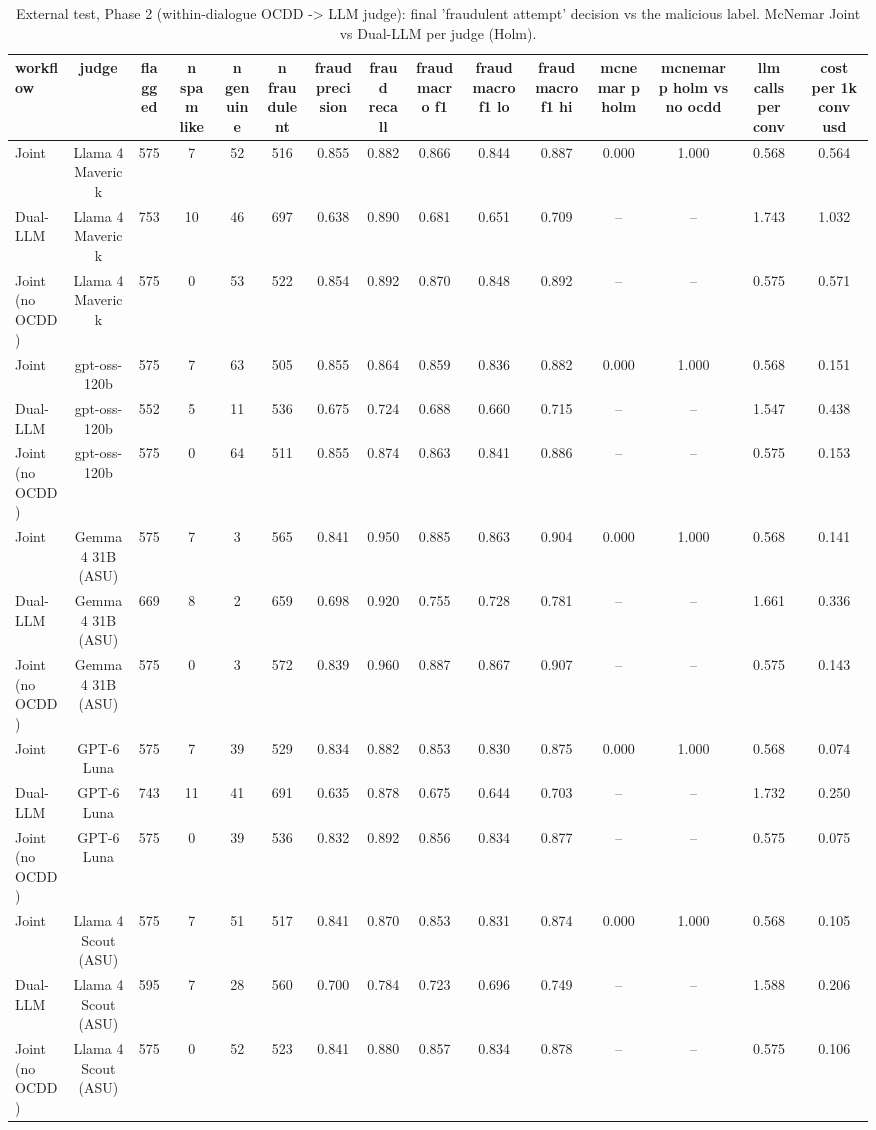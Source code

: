 \begin{table}[htbp]
\centering
\caption{External test, Phase 2 (within-dialogue OCDD -> LLM judge): final 'fraudulent attempt' decision vs the malicious label. McNemar Joint vs Dual-LLM per judge (Holm).}
\label{tab:table9_external_phase2}
\small
\begin{tabular}{lcccccccccccccc}
\toprule
\textbf{workflow} & \textbf{judge} & \textbf{flagged} & \textbf{n spam like} & \textbf{n genuine} & \textbf{n fraudulent} & \textbf{fraud precision} & \textbf{fraud recall} & \textbf{fraud macro f1} & \textbf{fraud macro f1 lo} & \textbf{fraud macro f1 hi} & \textbf{mcnemar p holm} & \textbf{mcnemar p holm vs no ocdd} & \textbf{llm calls per conv} & \textbf{cost per 1k conv usd} \\
\midrule
Joint & Llama 4 Maverick & 575 & 7 & 52 & 516 & 0.855 & 0.882 & 0.866 & 0.844 & 0.887 & 0.000 & 1.000 & 0.568 & 0.564 \\
Dual-LLM & Llama 4 Maverick & 753 & 10 & 46 & 697 & 0.638 & 0.890 & 0.681 & 0.651 & 0.709 & -- & -- & 1.743 & 1.032 \\
Joint (no OCDD) & Llama 4 Maverick & 575 & 0 & 53 & 522 & 0.854 & 0.892 & 0.870 & 0.848 & 0.892 & -- & -- & 0.575 & 0.571 \\
Joint & gpt-oss-120b & 575 & 7 & 63 & 505 & 0.855 & 0.864 & 0.859 & 0.836 & 0.882 & 0.000 & 1.000 & 0.568 & 0.151 \\
Dual-LLM & gpt-oss-120b & 552 & 5 & 11 & 536 & 0.675 & 0.724 & 0.688 & 0.660 & 0.715 & -- & -- & 1.547 & 0.438 \\
Joint (no OCDD) & gpt-oss-120b & 575 & 0 & 64 & 511 & 0.855 & 0.874 & 0.863 & 0.841 & 0.886 & -- & -- & 0.575 & 0.153 \\
Joint & Gemma 4 31B (ASU) & 575 & 7 & 3 & 565 & 0.841 & 0.950 & 0.885 & 0.863 & 0.904 & 0.000 & 1.000 & 0.568 & 0.141 \\
Dual-LLM & Gemma 4 31B (ASU) & 669 & 8 & 2 & 659 & 0.698 & 0.920 & 0.755 & 0.728 & 0.781 & -- & -- & 1.661 & 0.336 \\
Joint (no OCDD) & Gemma 4 31B (ASU) & 575 & 0 & 3 & 572 & 0.839 & 0.960 & 0.887 & 0.867 & 0.907 & -- & -- & 0.575 & 0.143 \\
Joint & GPT-6 Luna & 575 & 7 & 39 & 529 & 0.834 & 0.882 & 0.853 & 0.830 & 0.875 & 0.000 & 1.000 & 0.568 & 0.074 \\
Dual-LLM & GPT-6 Luna & 743 & 11 & 41 & 691 & 0.635 & 0.878 & 0.675 & 0.644 & 0.703 & -- & -- & 1.732 & 0.250 \\
Joint (no OCDD) & GPT-6 Luna & 575 & 0 & 39 & 536 & 0.832 & 0.892 & 0.856 & 0.834 & 0.877 & -- & -- & 0.575 & 0.075 \\
Joint & Llama 4 Scout (ASU) & 575 & 7 & 51 & 517 & 0.841 & 0.870 & 0.853 & 0.831 & 0.874 & 0.000 & 1.000 & 0.568 & 0.105 \\
Dual-LLM & Llama 4 Scout (ASU) & 595 & 7 & 28 & 560 & 0.700 & 0.784 & 0.723 & 0.696 & 0.749 & -- & -- & 1.588 & 0.206 \\
Joint (no OCDD) & Llama 4 Scout (ASU) & 575 & 0 & 52 & 523 & 0.841 & 0.880 & 0.857 & 0.834 & 0.878 & -- & -- & 0.575 & 0.106 \\
\bottomrule
\end{tabular}
\end{table}